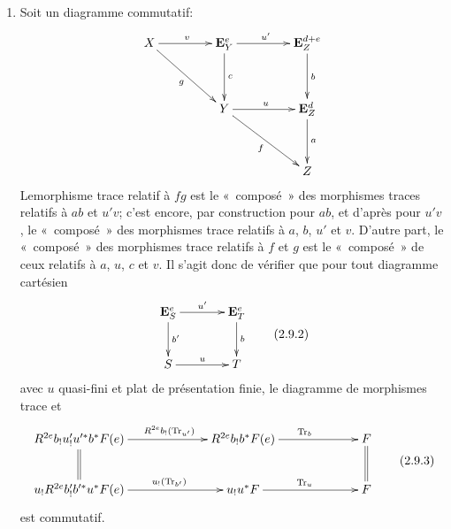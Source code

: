 \documentclass[10pt]{../fichiers-configuration-latex/smfart}
\begin{document}
\begin{enumerate}
Le lecteur qui voudrait polir les raisonnements qui suivent vérifiera
au préalable le

\begin{enonce*}{Lemme 2.9.1}
Soient $(f,g,h)$ trois morphismes $T$-compactifiables composables,
vérifiant $(\ast)_{k}$, $(\ast)_{\ell}$ et $(\ast)_{m}$.
$$
X\xrightarrow{h}Y\xrightarrow{g}Z\xrightarrow{f}T{\quoi}.
$$
Si les couples $(f,g)$ et $(g,h)$ vérifient {\rm (Var 3)}, alors pour
que $(f,gh)$ vérifie {\rm (Var 3)}, il faut et il suffit que $(fg,h)$
vérifie {\rm (Var 3)}.
\end{enonce*}

La condition envisagée dans la conclusion signifie encore que
$\Tr_{fgh}$ est « composé »  de $\Tr_{f}$, $\Tr_{g}$ et $\Tr_{h}$.

\item Soit un diagramme commutatif:
$$
\xymatrix@R=1.25cm@C=1.5cm{
X \ar[r]^{v} \ar[rd]_{g}& \EE^{e}_Y \ar[r]^{u'}\ar[d]^{c} & \EE_Z^{d+e}\ar[d]^{b} \\
            &     Y   \ar[r]^{u} \ar[rd]_{f}                       & \EE_Z^{d}\ar[d]^{a}  \\
            &                                  &     Z 
}
$$
Le\pageoriginale morphisme trace relatif à $fg$ est le
« composé » des morphismes traces relatifs à $ab$ et $u'v$; c'est encore, par
construction pour $ab$, et d'après  pour $u'v$, le « composé »  des morphismes trace relatifs à $a$, $b$, $u'$ et
$v$. D'autre part, le « composé »  des morphismes trace relatifs à
$f$ et $g$ est le « composé »  de ceux relatifs à $a$, $u$, $c$ et
$v$. Il s'agit donc de vérifier que pour tout diagramme cartésien
\begin{equation*}
\vcenter{
\xymatrix@C=1.25cm@R=1cm{
\EE^{e}_S  \ar[d]^{b'} \ar[r]^{u'}   & \EE^{e}_T \ar[d]^{b}\\
    S      \ar[r]^{u}     &      T
}}\tag{2.9.2}
\end{equation*}%
avec $u$ quasi-fini et plat de présentation finie, le diagramme de
morphismes trace  et 
\begin{equation*}
\vcenter{
\xymatrix@C=2.25cm{
R^{2e}b_!u'_! u'^{\ast}b {}^{\ast} F(e) \ar[r]^(.55){R^{2e}b_!
  (\Tr_{u'})}\ar@{=}[d]& R^{2e}b_! b^{\ast} F(e)\ar[r]^{\Tr_b}
&  F \ar@{=}[d]\\
u_! R^{2e}b'_! b'^{\ast} u^{\ast} F(e)\ar[r]^(.55){u_!(\Tr_{b'})} & u_!
u^{\ast} F \ar[r]^{\Tr_u}& F
}}\tag{2.9.3}
\end{equation*}%
est commutatif.
\end{enumerate}
\end{document}
